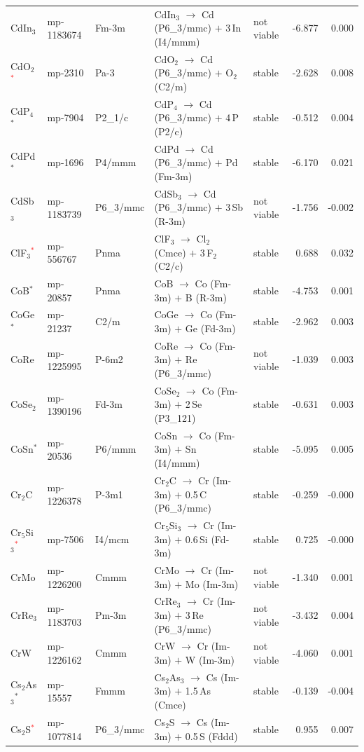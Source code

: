 \begin{longtable}{@{}ll l@{\hspace{4pt}} p{4.6cm} l@{\hspace{4pt}} rr@{}}
CdIn$_{3}$ & mp-1183674 & Fm-3m & CdIn$_{3}$ $\to$ Cd (P6\_3/mmc) $+$ 3\,In (I4/mmm) & not viable & -6.877 & 0.000 \\
CdO$_{2}$\textcolor{red}{$^*$} & mp-2310 & Pa-3 & CdO$_{2}$ $\to$ Cd (P6\_3/mmc) $+$ O$_{2}$ (C2/m) & stable & -2.628 & 0.008 \\
CdP$_{4}$$^*$ & mp-7904 & P2\_1/c & CdP$_{4}$ $\to$ Cd (P6\_3/mmc) $+$ 4\,P (P2/c) & stable & -0.512 & 0.004 \\
CdPd$^*$ & mp-1696 & P4/mmm & CdPd $\to$ Cd (P6\_3/mmc) $+$ Pd (Fm-3m) & stable & -6.170 & 0.021 \\
CdSb$_{3}$ & mp-1183739 & P6\_3/mmc & CdSb$_{3}$ $\to$ Cd (P6\_3/mmc) $+$ 3\,Sb (R-3m) & not viable & -1.756 & -0.002 \\
ClF$_{3}$\textcolor{red}{$^*$} & mp-556767 & Pnma & ClF$_{3}$ $\to$ Cl$_{2}$ (Cmce) $+$ 3\,F$_{2}$ (C2/c) & stable & 0.688 & 0.032 \\
CoB$^*$ & mp-20857 & Pnma & CoB $\to$ Co (Fm-3m) $+$ B (R-3m) & stable & -4.753 & 0.001 \\
CoGe$^*$ & mp-21237 & C2/m & CoGe $\to$ Co (Fm-3m) $+$ Ge (Fd-3m) & stable & -2.962 & 0.003 \\
CoRe & mp-1225995 & P-6m2 & CoRe $\to$ Co (Fm-3m) $+$ Re (P6\_3/mmc) & not viable & -1.039 & 0.003 \\
CoSe$_{2}$ & mp-1390196 & Fd-3m & CoSe$_{2}$ $\to$ Co (Fm-3m) $+$ 2\,Se (P3\_121) & stable & -0.631 & 0.003 \\
CoSn$^*$ & mp-20536 & P6/mmm & CoSn $\to$ Co (Fm-3m) $+$ Sn (I4/mmm) & stable & -5.095 & 0.005 \\
Cr$_{2}$C & mp-1226378 & P-3m1 & Cr$_{2}$C $\to$ Cr (Im-3m) $+$ 0.5\,C (P6\_3/mmc) & stable & -0.259 & -0.000 \\
Cr$_{5}$Si$_{3}$\textcolor{red}{$^*$} & mp-7506 & I4/mcm & Cr$_{5}$Si$_{3}$ $\to$ Cr (Im-3m) $+$ 0.6\,Si (Fd-3m) & stable & 0.725 & -0.000 \\
CrMo & mp-1226200 & Cmmm & CrMo $\to$ Cr (Im-3m) $+$ Mo (Im-3m) & not viable & -1.340 & 0.001 \\
CrRe$_{3}$ & mp-1183703 & Pm-3m & CrRe$_{3}$ $\to$ Cr (Im-3m) $+$ 3\,Re (P6\_3/mmc) & not viable & -3.432 & 0.004 \\
CrW & mp-1226162 & Cmmm & CrW $\to$ Cr (Im-3m) $+$ W (Im-3m) & not viable & -4.060 & 0.001 \\
Cs$_{2}$As$_{3}$$^*$ & mp-15557 & Fmmm & Cs$_{2}$As$_{3}$ $\to$ Cs (Im-3m) $+$ 1.5\,As (Cmce) & stable & -0.139 & -0.004 \\
Cs$_{2}$S\textcolor{red}{$^*$} & mp-1077814 & P6\_3/mmc & Cs$_{2}$S $\to$ Cs (Im-3m) $+$ 0.5\,S (Fddd) & stable & 0.955 & 0.007 \\

\end{longtable}
